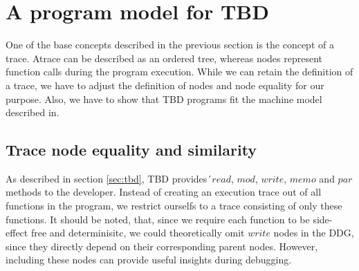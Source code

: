 \section{A program model for TBD}
One of the base concepts described in the previous section is the concept of a trace. Atrace can be described as an ordered tree, whereas nodes represent function calls during the program execution. While we can retain the definition of a trace, we have to adjust the definition of nodes and node equality for our purpose. Also, we have to show that TBD programs fit the machine model described in\cite{Acar2005thesis}.

\subsection{Trace node equality and similarity}

As described in section \ref{sec:tbd}, TBD provides´$read$, $mod$, $write$, $memo$ and $par$ methods to the developer. Instead of creating an execution trace out of all  functions in the program, we restrict ourselfs to a trace consisting of only these functions. It should be noted, that, since we require each function to be side-effect free and determinisitc, we could theoretically omit $write$ nodes in the DDG, since they directly depend on their corresponding parent nodes. However, including these nodes can provide useful insights during debugging. 

